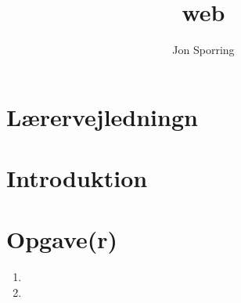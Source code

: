 \documentclass[a4paper,12pt]{article}
\title{web}
\author{Jon Sporring}
\begin{document}
\maketitle

\section{Lærervejledningn}

\section{Introduktion}

\section{Opgave(r)}
\begin{enumerate}
\item 
\item 
\end{enumerate}
\end{document}
